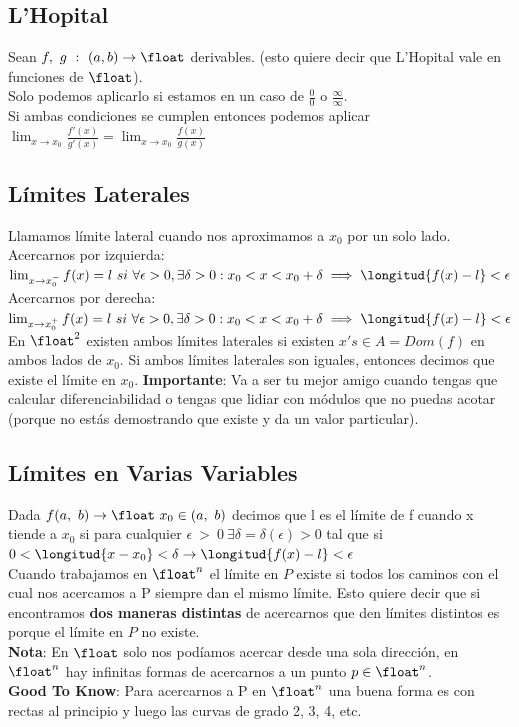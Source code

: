 \documentclass[10pt,a4paper]{article}
\newcommand{\limitDef}{f(x) = l \ si \ \forall \epsilon > 0, \exists \delta > 0 : x_{0} < x < x_{0} + \delta \implies \longitud{f(x)-l}<\epsilon}
\begin{document}
\subsection*{L'Hopital}
Sean $f, \ g \ : \ (a, b) \rightarrow \float $ derivables. (esto quiere decir que L'Hopital vale en funciones de $\float$). \\
Solo podemos aplicarlo si estamos en un caso de $\frac{0}{0}$ o $\frac{\infty}{\infty}$. \\
Si ambas condiciones se cumplen entonces podemos aplicar
$\lim_{x\to x_{0}} \frac{f'(x)}{g'(x)} = \lim_{x\to x_{0}} \frac{f(x)}{g(x)} $
\subsection*{Límites Laterales}
Llamamos límite lateral cuando nos aproximamos a $x_{0}$ por un solo lado. \\
Acercarnos por izquierda: $\lim_{x\to x_{0}^{-}} \limitDef$  \\
Acercarnos por derecha: $\lim_{x\to x_{0}^{+}} \limitDef$ \\
En $\float^{2}$ existen ambos límites laterales si existen $x's \in A = Dom(f)$ en ambos lados de $x_{0}$. Si ambos límites laterales son iguales, entonces decimos que existe el límite en $x_{0}$.
\textbf{Importante}: Va a ser tu mejor amigo cuando tengas que calcular diferenciabilidad o tengas que lidiar con módulos que no puedas acotar (porque no estás demostrando que existe y da un valor particular).
\subsection*{Límites en Varias Variables}
Dada $f(a, \ b) \rightarrow \float \ x_{0} \in (a,\ b)$ decimos que l es el límite de f cuando x tiende a $x_{0}$ si para cualquier $\epsilon \ > \ 0 \ \exists \delta = \delta(\epsilon) > 0$ tal que si $ 0 < \longitud{x-x_{0}} < \delta \rightarrow \longitud{f(x) - l} < \epsilon$  \\
Cuando trabajamos en $\float^{n}$ el límite en $P$ existe si todos los caminos con el cual nos acercamos a P siempre dan el mismo límite. Esto quiere decir que si encontramos \textbf{dos maneras distintas} de acercarnos que den límites distintos es porque el límite en $P$ no existe. \\
\textbf{Nota}: En $\float$ solo nos podíamos acercar desde una sola dirección, en $\float^{n}$ hay infinitas formas de acercarnos a un punto $p \in \float^{n}$. \\
\textbf{Good To Know}: Para acercarnos a P en $\float^{n}$ una buena forma es con rectas al principio y luego las curvas de grado 2, 3, 4, etc. 
\end{document}

